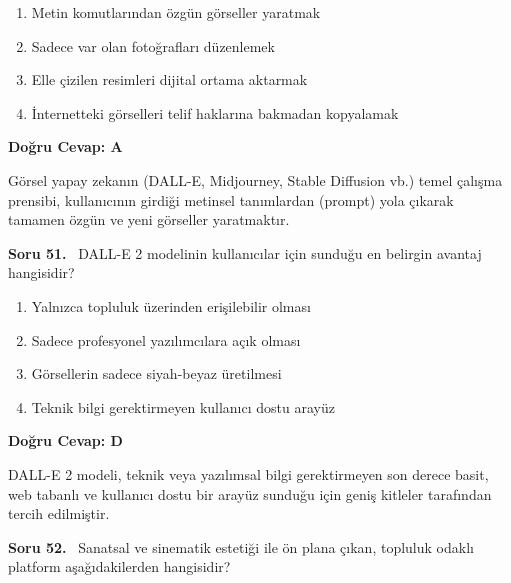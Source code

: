\documentclass[11pt,a4paper,openany]{book}
\begin{document}
\begin{enumerate}[label=\Alph*), leftmargin=25pt, topsep=4pt, itemsep=2pt]
        \item Metin komutlarından özgün görseller yaratmak
        \item Sadece var olan fotoğrafları düzenlemek
        \item Elle çizilen resimleri dijital ortama aktarmak
        \item İnternetteki görselleri telif haklarına bakmadan kopyalamak
\end{enumerate}

\vspace{4pt}
\begin{tcolorbox}[title=Cevap ve Açıklama, colback=gray!3!white, colframe=primarycolor!90!black, arc=2mm, fonttitle=\bfseries\sffamily, top=6pt, bottom=6pt]
    \textbf{Doğru Cevap: A}

    \vspace{2pt}
    Görsel yapay zekanın (DALL-E, Midjourney, Stable Diffusion vb.) temel çalışma prensibi, kullanıcının girdiği metinsel tanımlardan (prompt) yola çıkarak tamamen özgün ve yeni görseller yaratmaktır.
\end{tcolorbox}
\vspace{10pt}
\needspace{5cm}
\vspace{8pt}
\noindent\textbf{\large\sffamily Soru 51.} \ DALL-E 2 modelinin kullanıcılar için sunduğu en belirgin avantaj hangisidir?

\begin{enumerate}[label=\Alph*), leftmargin=25pt, topsep=4pt, itemsep=2pt]
        \item Yalnızca topluluk üzerinden erişilebilir olması
        \item Sadece profesyonel yazılımcılara açık olması
        \item Görsellerin sadece siyah-beyaz üretilmesi
        \item Teknik bilgi gerektirmeyen kullanıcı dostu arayüz
\end{enumerate}

\vspace{4pt}
\begin{tcolorbox}[title=Cevap ve Açıklama, colback=gray!3!white, colframe=primarycolor!90!black, arc=2mm, fonttitle=\bfseries\sffamily, top=6pt, bottom=6pt]
    \textbf{Doğru Cevap: D}

    \vspace{2pt}
    DALL-E 2 modeli, teknik veya yazılımsal bilgi gerektirmeyen son derece basit, web tabanlı ve kullanıcı dostu bir arayüz sunduğu için geniş kitleler tarafından tercih edilmiştir.
\end{tcolorbox}
\vspace{10pt}
\needspace{5cm}
\vspace{8pt}
\noindent\textbf{\large\sffamily Soru 52.} \ Sanatsal ve sinematik estetiği ile ön plana çıkan, topluluk odaklı platform aşağıdakilerden hangisidir?
\end{document}
